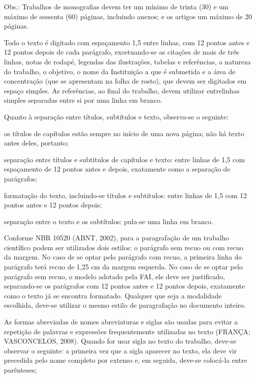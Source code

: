 \begin{Desenvolvimento}
Obs.: Trabalhos de monografias devem ter um mínimo de trinta (30) e um máximo de sessenta (60) páginas, incluindo anexos; e os artigos um máximo de 20 páginas.

Todo o texto é digitado com espaçamento 1,5 entre linhas, com 12 pontos antes e 12 pontos depois de cada parágrafo, excetuando-se as citações de mais de três linhas, notas de rodapé, legendas das ilustrações, tabelas e referências, a natureza do trabalho, o objetivo, o nome da Instituição a que é submetida e a área de concentração (que se apresentam na folha de rosto), que devem ser digitados em espaço simples. As referências, ao final do trabalho, devem utilizar entrelinhas simples separadas entre si por uma linha em branco.

Quanto à separação entre títulos, subtítulos e texto, observa-se o seguinte:

\begin{alinea}
  \item os títulos de capítulos estão sempre no início de uma nova página; não há texto antes deles, portanto;
  \item separação entre títulos e subtítulos de capítulos e texto: entre linhas de 1,5 com espaçamento de 12 pontos antes e depois, exatamente como a separação de parágrafos;
  \item formatação do texto, incluindo-se títulos e subtítulos: entre linhas de 1,5 com 12 pontos antes e 12 pontos depois;
  \item separação entre o texto e os subtítulos: pula-se uma linha em branco.
\end{alinea}

Conforme NBR 10520 (ABNT, 2002), para a paragrafação de um trabalho científico podem ser utilizados dois estilos: o parágrafo sem recuo ou com recuo da margem. No caso de se optar pelo parágrafo com recuo, a primeira linha do parágrafo terá recuo de 1,25 cm da margem esquerda. No caso de se optar pelo parágrafo sem recuo, o modelo adotado pela FAI, ele deve ser justificado, separando-se os parágrafos com 12 pontos antes e 12 pontos depois, exatamente como o texto já se encontra formatado. Qualquer que seja a modalidade escolhida, deve-se utilizar o mesmo estilo de paragrafação no documento inteiro.

As formas abreviadas de nomes abreviaturas e siglas são usadas para evitar a repetição de palavras e expressões frequentemente utilizadas no texto (FRANÇA; VASCONCELOS, 2008). Quando for usar sigla no texto do trabalho, deve-se observar o seguinte: a primeira vez que a sigla aparecer no texto, ela deve vir precedida pelo nome completo por extenso e, em seguida, deve-se colocá-la entre parênteses;


\end{Desenvolvimento}
